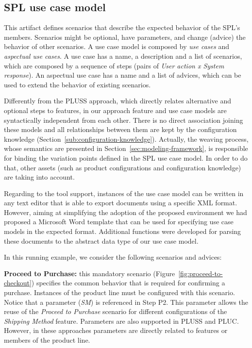\documentclass{acm_proc_article-sp}
\begin{document}
\subsection{SPL use case model}\label{sub:spl-uc}

This artifact defines scenarios that describe the expected behavior of the SPL's
members. Scenarios might be optional, have parameters, and change (advice) the
behavior of other scenarios. A use case model is composed by \emph{use cases} and
\emph{aspectual use cases}. A use case has a name, a description and a list of
scenarios, which are composed by a sequence of steps (pairs of \emph{User action x
System response}). An aspectual use case has a name and a list of advices, which
can be used to extend the behavior of existing scenarios.

Differently from the PLUSS
approach, which directly relates alternative and optional steps to features, in
our approach {\color{red}feature and use
case models are syntactically independent from each other. There is no direct
association joining these models and all relationships between them are kept by
the configuration knowledge (Section~\ref{sub:configuration-knowledge}).}
 {\color{red} Actually, the weaving process, whose semantics are presented in Section~\ref{sec:modeling-framework}, is responsible for binding the variation points defined in the SPL use case model. In order to do that, other assets (such as product configurations and configuration knowledge) are taking into account.}

{\color{red} Regarding to the tool support, instances of the use case model can be written in any text editor that is able to export documents using a specific XML format. However, aiming at simplifying the adoption of the proposed environment we had proposed a Microsoft Word template that can be used for specifying use case models in the expected format. Additional functions were developed for parsing these documents to the abstract data type of our use case model.}  

In this running example, we consider the following scenarios and advices:

{\bf Proceed to Purchase:} this mandatory scenario
(Figure~\ref{fig:proceed-to-checkout}) specifies the common behavior that is
required for confirming a purchase. Instances of the product line must be
configured with this scenario. 
Notice that a parameter (\emph{SM}) is referenced in Step P2. 
This parameter allows the reuse of the \emph{Proceed to
Purchase} scenario for different configurations of the \emph{Shipping Method} feature. {\color{red} Parameters 
are also supported in PLUSS and PLUC. However, in these approaches parameters are directly related to features or members of the product line.}
\end{document}
